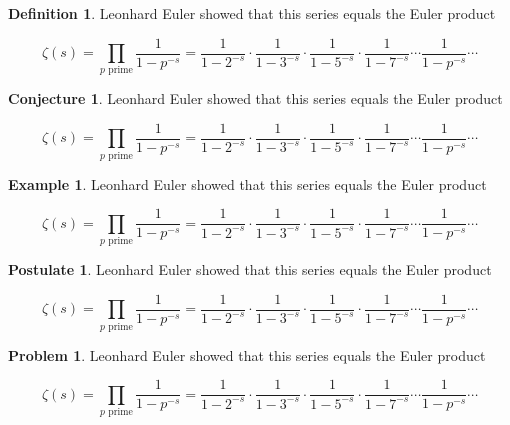 \documentclass[english,oneside, article]{memoir}
\theoremstyle{plain}
\theoremstyle{definition}
\newtheorem{Definition}{Definition}[chapter]
\newtheorem{Conjecture}{Conjecture}[chapter]
\newtheorem{Example}{Example}[chapter]
\newtheorem{Postulate}{Postulate}[chapter]
\newtheorem{Problem}{Problem}[chapter]
\theoremstyle{remark}
\begin{document}
\begin{Definition}

Leonhard Euler showed that this series equals the Euler product

\[\zeta(s) = \prod_{p \text{ prime}} \frac{1}{1-p^{-s}}= \frac{1}{1-2^{-s}}\cdot\frac{1}{1-3^{-s}}\cdot\frac{1}{1-5^{-s}}\cdot\frac{1}{1-7^{-s}} \cdots \frac{1}{1-p^{-s}} \cdots\]

\end{Definition}

\begin{Conjecture}

Leonhard Euler showed that this series equals the Euler product

\[\zeta(s) = \prod_{p \text{ prime}} \frac{1}{1-p^{-s}}= \frac{1}{1-2^{-s}}\cdot\frac{1}{1-3^{-s}}\cdot\frac{1}{1-5^{-s}}\cdot\frac{1}{1-7^{-s}} \cdots \frac{1}{1-p^{-s}} \cdots\]

\end{Conjecture}

\begin{Example}

Leonhard Euler showed that this series equals the Euler product

\[\zeta(s) = \prod_{p \text{ prime}} \frac{1}{1-p^{-s}}= \frac{1}{1-2^{-s}}\cdot\frac{1}{1-3^{-s}}\cdot\frac{1}{1-5^{-s}}\cdot\frac{1}{1-7^{-s}} \cdots \frac{1}{1-p^{-s}} \cdots\]

\end{Example}

\begin{Postulate}

Leonhard Euler showed that this series equals the Euler product

\[\zeta(s) = \prod_{p \text{ prime}} \frac{1}{1-p^{-s}}= \frac{1}{1-2^{-s}}\cdot\frac{1}{1-3^{-s}}\cdot\frac{1}{1-5^{-s}}\cdot\frac{1}{1-7^{-s}} \cdots \frac{1}{1-p^{-s}} \cdots\]

\end{Postulate}

\begin{Problem}

Leonhard Euler showed that this series equals the Euler product

\[\zeta(s) = \prod_{p \text{ prime}} \frac{1}{1-p^{-s}}= \frac{1}{1-2^{-s}}\cdot\frac{1}{1-3^{-s}}\cdot\frac{1}{1-5^{-s}}\cdot\frac{1}{1-7^{-s}} \cdots \frac{1}{1-p^{-s}} \cdots\]

\end{Problem}
\end{document}
